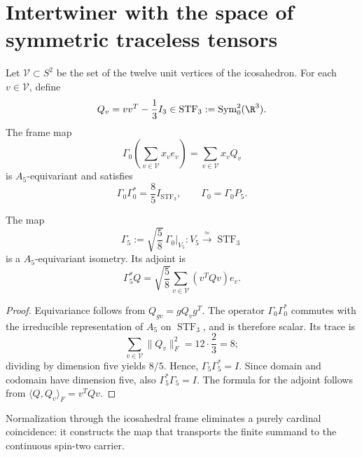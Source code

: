 \section{Intertwiner with the space of symmetric traceless tensors}

Let \(\mathcal V\subset S^2\) be the set of the twelve unit vertices
of the icosahedron. For each \(v\in\mathcal V\), define
\begin{equation}
\label{rm:eq:gravity-Qv}
Q_v=vv^T-\frac13I_3\in
\operatorname{STF}_3:=\operatorname{Sym}^2_0(\R^3).
\end{equation}
The frame map
\begin{equation}
\label{rm:eq:gravity-Gamma0}
\Gamma_0\!\left(\sum_{v\in\mathcal V}x_ve_v\right)
=\sum_{v\in\mathcal V}x_vQ_v
\end{equation}
is \(A_5\)-equivariant and satisfies
\begin{equation}
\label{rm:eq:gravity-tight-frame}
\Gamma_0\Gamma_0^*=\frac85I_{\operatorname{STF}_3},
\qquad
\Gamma_0=\Gamma_0P_5.
\end{equation}

\begin{theorem}
\label{rm:thm:gravity-gamma5}
The map
\begin{equation}
\label{rm:eq:gravity-gamma5}
\boxed{
\Gamma_5:=\sqrt{\frac58}\,\Gamma_0|_{V_5}:
V_5\xrightarrow{\ \simeq\ }\operatorname{STF}_3}
\end{equation}
is a \(A_5\)-equivariant isometry. Its adjoint is
\begin{equation}
\label{rm:eq:gravity-gamma5-adjoint}
\Gamma_5^*Q=\sqrt{\frac58}
\sum_{v\in\mathcal V}(v^TQv)e_v.
\end{equation}
\end{theorem}

\begin{proof}
Equivariance follows from \(Q_{gv}=gQ_vg^T\). The operator
\(\Gamma_0\Gamma_0^*\) commutes with the irreducible representation of
\(A_5\) on \(\operatorname{STF}_3\), and is therefore scalar. Its trace
is
\[
\sum_{v\in\mathcal V}\|Q_v\|_F^2
=12\cdot\frac23=8;
\]
dividing by dimension five yields \(8/5\). Hence,
\(\Gamma_5\Gamma_5^*=I\). Since domain and codomain have dimension
five, also \(\Gamma_5^*\Gamma_5=I\). The formula for the adjoint
follows from \(\langle Q,Q_v\rangle_F=v^TQv\).
\end{proof}

Normalization through the icosahedral frame
eliminates a purely cardinal coincidence: it constructs the map that
transports the finite summand to the continuous spin-two
carrier.

